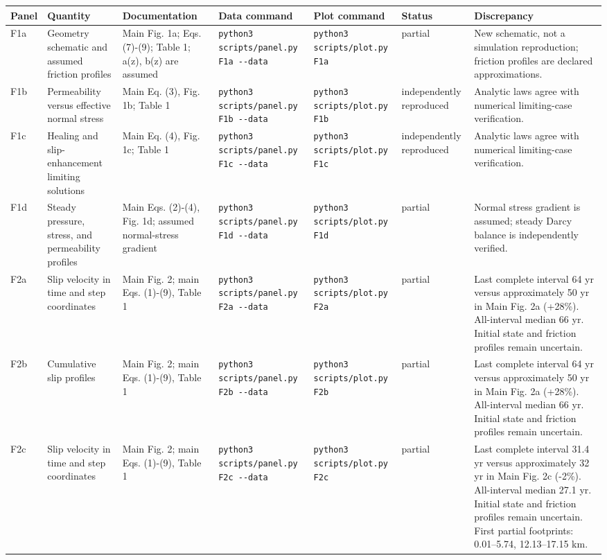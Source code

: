 \documentclass[11pt]{article}
\begin{document}
\begin{landscape}\scriptsize
\setlength{\tabcolsep}{3pt}
\begin{longtable}{P{10mm}P{30mm}P{34mm}P{39mm}P{32mm}P{23mm}P{65mm}}
\toprule Panel & Quantity & Documentation & Data command & Plot command & Status & Discrepancy\\\midrule\endhead
F1a & Geometry schematic and assumed friction profiles & Main Fig. 1a; Eqs. (7)-(9); Table 1; a(z), b(z) are assumed & \texttt{python3 scripts/panel.py F1a -{}-data} & \texttt{python3 scripts/plot.py F1a} & partial & New schematic, not a simulation reproduction; friction profiles are declared approximations.\\[5pt]
F1b & Permeability versus effective normal stress & Main Eq. (3), Fig. 1b; Table 1 & \texttt{python3 scripts/panel.py F1b -{}-data} & \texttt{python3 scripts/plot.py F1b} & independently reproduced & Analytic laws agree with numerical limiting-case verification.\\[5pt]
F1c & Healing and slip-enhancement limiting solutions & Main Eq. (4), Fig. 1c; Table 1 & \texttt{python3 scripts/panel.py F1c -{}-data} & \texttt{python3 scripts/plot.py F1c} & independently reproduced & Analytic laws agree with numerical limiting-case verification.\\[5pt]
F1d & Steady pressure, stress, and permeability profiles & Main Eqs. (2)-(4), Fig. 1d; assumed normal-stress gradient & \texttt{python3 scripts/panel.py F1d -{}-data} & \texttt{python3 scripts/plot.py F1d} & partial & Normal stress gradient is assumed; steady Darcy balance is independently verified.\\[5pt]
F2a & Slip velocity in time and step coordinates & Main Fig. 2; main Eqs. (1)-(9), Table 1 & \texttt{python3 scripts/panel.py F2a -{}-data} & \texttt{python3 scripts/plot.py F2a} & partial & Last complete interval 64 yr versus approximately 50 yr in Main Fig. 2a (+28\%). All-interval median 66 yr. Initial state and friction profiles remain uncertain.\\[5pt]
F2b & Cumulative slip profiles & Main Fig. 2; main Eqs. (1)-(9), Table 1 & \texttt{python3 scripts/panel.py F2b -{}-data} & \texttt{python3 scripts/plot.py F2b} & partial & Last complete interval 64 yr versus approximately 50 yr in Main Fig. 2a (+28\%). All-interval median 66 yr. Initial state and friction profiles remain uncertain.\\[5pt]
F2c & Slip velocity in time and step coordinates & Main Fig. 2; main Eqs. (1)-(9), Table 1 & \texttt{python3 scripts/panel.py F2c -{}-data} & \texttt{python3 scripts/plot.py F2c} & partial & Last complete interval 31.4 yr versus approximately 32 yr in Main Fig. 2c (-2\%). All-interval median 27.1 yr. Initial state and friction profiles remain uncertain. First partial footprints: 0.01--5.74, 12.13--17.15 km.\\[5pt]

\end{longtable}
\end{landscape}
\end{document}

